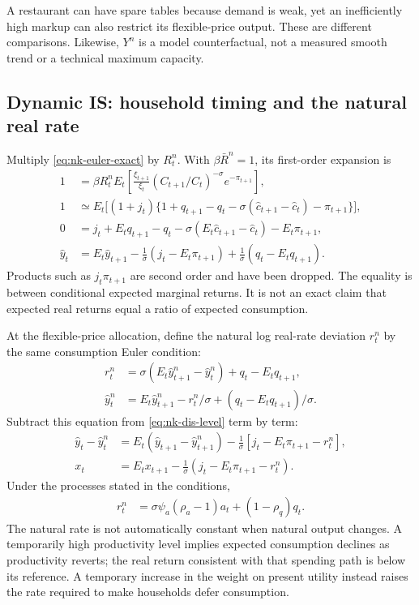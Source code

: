A restaurant can have spare tables because demand is weak, yet an inefficiently
high markup can also restrict its flexible-price output. These are different
comparisons. Likewise, $Y^n$ is a model counterfactual, not a measured smooth
trend or a technical maximum capacity.

\subsection{Dynamic IS: household timing and the natural real rate}

Multiply \eqref{eq:nk-euler-exact} by $R_t^n$. With
$\beta\bar R^n=1$, its first-order expansion is
\begin{align}
 1&=\beta R_t^n E_t\left[
  \frac{\xi_{t+1}}{\xi_t}(C_{t+1}/C_t)^{-\sigma}e^{-\pi_{t+1}}\right],\\
 1&\simeq E_t\big[(1+j_t)
    \{1+q_{t+1}-q_t-\sigma(\hat c_{t+1}-\hat c_t)-\pi_{t+1}\}\big],\\
 0&=j_t+E_tq_{t+1}-q_t
           -\sigma(E_t\hat c_{t+1}-\hat c_t)-E_t\pi_{t+1},\\
 \hat y_t&=E_t\hat y_{t+1}
      -\frac1\sigma(j_t-E_t\pi_{t+1})
      +\frac1\sigma(q_t-E_tq_{t+1}).\label{eq:nk-dis-level}
\end{align}
Products such as $j_t\pi_{t+1}$ are second order and have been dropped.
The equality is between conditional expected marginal returns. It is not an
exact claim that expected real returns equal a ratio of expected consumption.

At the flexible-price allocation, define the natural log real-rate deviation
$r_t^n$ by the same consumption Euler condition:
\begin{align}
 r_t^n&=\sigma(E_t\hat y_{t+1}^n-\hat y_t^n)+q_t-E_tq_{t+1},\\
 \hat y_t^n&=E_t\hat y_{t+1}^n-r_t^n/\sigma
                             +(q_t-E_tq_{t+1})/\sigma.
\end{align}
Subtract this equation from \eqref{eq:nk-dis-level} term by term:
\begin{align}
 \hat y_t-\hat y_t^n
 &=E_t(\hat y_{t+1}-\hat y_{t+1}^n)
       -\frac1\sigma[j_t-E_t\pi_{t+1}-r_t^n],\\
 x_t&=E_tx_{t+1}-\frac1\sigma(j_t-E_t\pi_{t+1}-r_t^n).
 \label{eq:nk-dis-gap}
\end{align}
Under the processes stated in the conditions,
\begin{align}
 r_t^n&=\sigma\psi_a(\rho_a-1)a_t+(1-\rho_q)q_t.
\end{align}
The natural rate is not automatically constant when natural output changes.
A temporarily high productivity level implies expected consumption declines
as productivity reverts; the real return consistent with that spending path
is below its reference. A temporary increase in the weight on present utility
instead raises the rate required to make households defer consumption.

